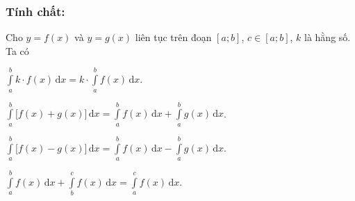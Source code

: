 \subsubsection{Tính chất:}
Cho  $y=f(x)$ và $y=g(x)$ liên tục trên đoạn $[a;b]$, $c \in [a;b]$, $k$ là hằng số. Ta có
\begin{listEX}[2]
	\item [\ding{172}] $\displaystyle\int\limits_a^b{k\cdot f(x)}\mathrm{\,d}x=k\cdot \displaystyle\int\limits_a^b{f(x)}\mathrm{\,d}x$.
	\item [\ding{173}] $\displaystyle\int\limits_a^b{\bigg[{f(x)+ g(x)}\bigg]}\mathrm{\,d}x=\displaystyle\int\limits_a^b{f(x)}\mathrm{\,d}x+ \displaystyle\int\limits_a^b{g(x)}\mathrm{\,d}x$.
	\item [\ding{174}] $\displaystyle\int\limits_a^b{\bigg[{f(x)- g(x)}\bigg]}\mathrm{\,d}x=\displaystyle\int\limits_a^b{f(x)}\mathrm{\,d}x - \displaystyle\int\limits_a^b{g(x)}\mathrm{\,d}x$.
	\item [\ding{175}] $\displaystyle\int\limits_a^b{f(x)}\mathrm{\,d}x+\displaystyle\int\limits_b^c{f(x)}\mathrm{\,d}x=\displaystyle\int\limits_a^c{f(x)}\mathrm{\,d}x$.
\end{listEX}
